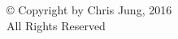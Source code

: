\documentclass[12pt]{book}
\begin{document}
\begin{singlespacing}\phantom{}\par\phantom{}\par\phantom{}\par\phantom{}\par\phantom{}\par\phantom{}\par\phantom{}\par\phantom{}\par\phantom{}\par\phantom{}\par\phantom{}\par\phantom{}\par\phantom{}\par\phantom{}\par\phantom{}\par\phantom{}\par\phantom{}\par\phantom{}\par\phantom{}\par\phantom{}

{\centering \copyright{} Copyright by Chris Jung, 2016\\All Rights Reserved \par}

\phantom{}\par\phantom{}\par\phantom{}\par\phantom{}\par\phantom{}\par\phantom{}\par\phantom{}\par\phantom{}\par\phantom{}\par\phantom{}\par\phantom{}\par\phantom{}\par\phantom{}\par\phantom{}\par\phantom{}\par\phantom{}\par\phantom{}\par\phantom{}\par\phantom{}\par\phantom{}\par\end{singlespacing}
\setcounter{page}{3}\clearpage\phantom{}\setcounter{page}{0}\clearpage
\end{document}
